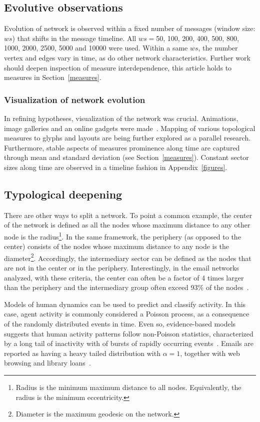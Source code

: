 \documentclass[%
 aip,
 jmp,%
 amsmath,amssymb,
 reprint,%
]{revtex4-1}
\begin{document}
   \subsection{Evolutive observations}
Evolution of network is observed within a fixed number of messages (window size: $ws$) that shifts in the message timeline.
 All $ws=$50, 100, 200, 400, 500, 800, 1000, 2000, 2500, 5000 and 10000 were used. Within a same $ws$, the number vertex and edges vary in time, as do other network characteristics. Further work should deepen inspection of measure interdependence, this article holds to measures in Section~\ref{measures}.

        \subsubsection*{Visualization of network evolution}
In refining hypotheses, visualization of the network was crucial. Animations, image galleries and an online gadgets were made~\cite{animacoes,galGMANE,appGMANE}. Mapping of various topological measures to glyphs and layouts are being further explored as a parallel research. Furthermore, stable aspects of measures prominence along time are captured through mean and standard deviation (see Section~\ref{measures}). Constant sector sizes along time are observed in a timeline fashion in Appendix~\ref{figures}.


    \subsection{Typological deepening}
There are other ways to split a network. To point a common example, the center of the network is defined as all the nodes whose maximum distance to any other node is the radius\footnote{Radius is the minimum maximum distance to all nodes. Equivalently, the radius is the minimum eccentricity.}. 
In the same framework, the periphery (as opposed to the center) consists of the nodes whose maximum distance to any node is the diameter\footnote{Diameter is the maximum geodesic on the network.}. Accordingly, the intermediary sector can be defined as the nodes that are not in the center or in the periphery. Interestingly, in the email networks analyzed, with these criteria, the center can often be a factor of 4 times larger than the periphery and the intermediary group often exceed 93\% of the nodes~\cite{networkx}.

Models of human dynamics can be used to predict and classify activity. In this case, agent activity is commonly considered a Poisson process, as a consequence of the randomly distributed events in time. Even so, evidence-based models suggests that human activity patterns follow non-Poisson statistics, characterized by a long tail of inactivity with of bursts of rapidly occurring events~\cite{barabasiHumanDyn,barabasiPhone}. Emails are reported as having a heavy tailed distribution with $\alpha=1$, together with web browsing and library loans~\cite{barabasiHumanDyn}.
\end{document}
